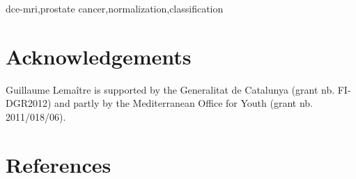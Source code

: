 \documentclass[review]{elsarticle}
\begin{document}
\begin{frontmatter}
\begin{keyword}
\acs*{dce}-\acs*{mri}\sep prostate cancer\sep normalization\sep classification
\end{keyword}

\end{frontmatter}

\acresetall
\linenumbers






\section*{Acknowledgements}
Guillaume Lema\^itre is supported by the Generalitat de Catalunya (grant nb. FI-DGR2012) and partly by the Mediterranean Office for Youth (grant nb. 2011/018/06).



\section*{References}


\end{document}
